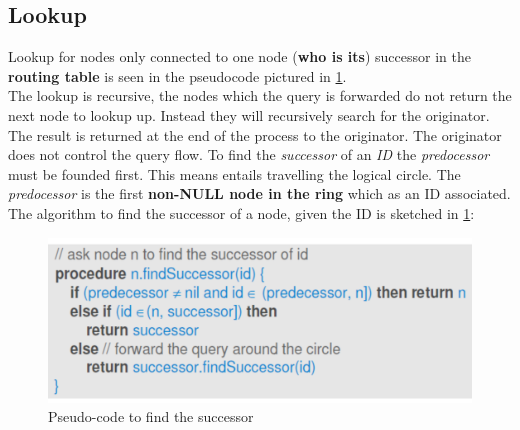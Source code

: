 \documentclass[10pt,a4paper]{report}
\begin{document}
\subsection{Lookup}\label{sec:lookup}
Lookup for nodes only connected to one node (\textbf{who is its}) successor in the \textbf{routing table} is seen in the pseudocode pictured in \ref{alg-ID}.\\
The lookup is recursive, the nodes which the query is forwarded do not return the next node to lookup up. Instead they will recursively search for the originator. The result is returned at the end of the process to the originator. The originator does not control the query flow.
To find the \textit{successor} of an \textit{ID} the \textit{predocessor} must be founded first. This means entails travelling the logical circle. The \textit{predocessor} is the first \textbf{non-NULL node in the ring} which as an ID associated.
The algorithm to find the successor of a node, given the ID is sketched in \ref{alg-ID}:
\begin{figure}[h]
	\centering
	\includegraphics[scale=0.20]{images/Pasted image 20230303114856.png}
	\caption{Pseudo-code to find the successor}
	\label{alg-ID}
\end{figure}
\end{document}
